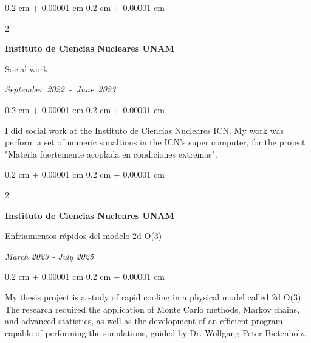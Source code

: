 \documentclass[10pt, letterpaper]{article}
\newenvironment{onecolentry}{
    \begin{adjustwidth}{
        0.2 cm + 0.00001 cm
    }{
        0.2 cm + 0.00001 cm
    }
}{
    \end{adjustwidth}
} %
\newenvironment{twocolentry}[2][]{
    \onecolentry
    \def\secondColumn{#2}
    \setcolumnwidth{\fill, 4.5 cm}
    \begin{paracol}{2}
}{
    \switchcolumn \raggedleft \secondColumn
    \end{paracol}
    \endonecolentry
} %
\let\hrefWithoutArrow\href
\renewcommand{\href}[2]{\hrefWithoutArrow{#1}{\ifthenelse{\equal{#2}{}}{ }{#2 }\raisebox{.15ex}{\footnotesize \faExternalLink*}}}
\begin{document}
        \vspace{0.2 cm}

        \begin{twocolentry}{
            \mbox{\textit{September 2022 - June 2023}}}
            \textbf{Instituto de Ciencias Nucleares UNAM}
            
            {\color{blue} Social work}
        \end{twocolentry}

        \vspace{0.10 cm}
        \begin{onecolentry}
            I did social work at the Instituto de Ciencias Nucleares ICN. My work was perform a set of numeric simaltions in the ICN's super computer, for the project "Materia fuertemente acoplada en condiciones extremas".
        \end{onecolentry}

        \vspace{0.2 cm}
        \begin{twocolentry}{
            
            \textit{March 2023 - July 2025}}
            \textbf{Instituto de Ciencias Nucleares UNAM}
            
            {\color{blue}Enfriamientos rápidos del modelo 2d O(3)}
        \end{twocolentry}

        \vspace{0.10 cm}
        \begin{onecolentry}
            My thesis project is a study of rapid cooling in a physical model called 2d O(3). The research required the application of Monte Carlo methods, Markov chains, and advanced statistics, as well as the development of an efficient program capable of performing the simulations, guided by Dr. Wolfgang Peter Bietenholz.
        \end{onecolentry}
\end{document}
